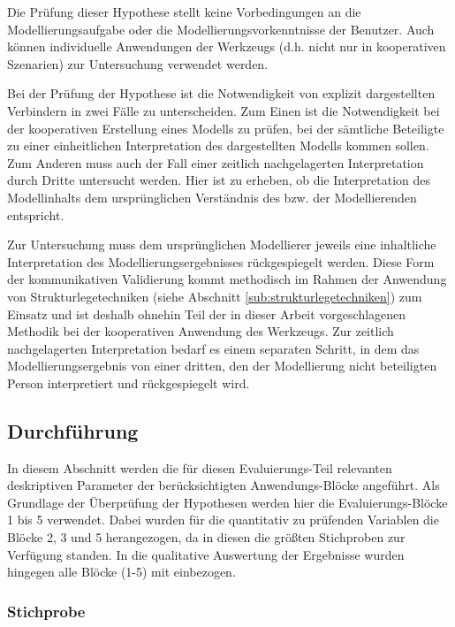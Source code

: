 Die Prüfung dieser Hypothese stellt keine Vorbedingungen an die Modellierungsaufgabe oder die Modellierungsvorkenntnisse der Benutzer. Auch können individuelle Anwendungen der Werkzeugs (d.h. nicht nur in kooperativen Szenarien) zur Untersuchung verwendet werden. 

Bei der Prüfung der Hypothese ist die Notwendigkeit von explizit dargestellten Verbindern in zwei Fälle zu unterscheiden. Zum Einen ist die Notwendigkeit bei der kooperativen Erstellung eines Modells zu prüfen, bei der sämtliche Beteiligte zu einer einheitlichen Interpretation des dargestellten Modells kommen sollen. Zum Anderen muss auch der Fall einer zeitlich nachgelagerten Interpretation durch Dritte untersucht werden. Hier ist zu erheben, ob die Interpretation des Modellinhalts dem ursprünglichen Verständnis des bzw. der Modellierenden entspricht.

Zur Untersuchung muss dem ursprünglichen Modellierer jeweils eine inhaltliche Interpretation des Modellierungsergebnisses rückgespiegelt werden. Diese Form der kommunikativen Validierung kommt methodisch im Rahmen der Anwendung von Strukturlegetechniken (siehe Abschnitt \ref{sub:strukturlegetechniken}) zum Einsatz und ist deshalb ohnehin Teil der in dieser Arbeit vorgeschlagenen Methodik bei der kooperativen Anwendung des Werkzeugs. Zur zeitlich nachgelagerten Interpretation bedarf es einem separaten Schritt, in dem das Modellierungsergebnis von einer dritten, den der Modellierung nicht beteiligten Person interpretiert und rückgespiegelt wird. 


\subsection{Durchführung} %
\label{sub:m_durchführung}

In diesem Abschnitt werden die für diesen Evaluierungs-Teil relevanten deskriptiven Parameter der berücksichtigten Anwendungs-Blöcke angeführt.
Als Grundlage der Überprüfung der Hypothesen werden hier die Evaluierungs-Blöcke 1 bis 5 verwendet. Dabei wurden für die quantitativ zu prüfenden Variablen die Blöcke 2, 3 und 5 herangezogen, da in diesen die größten Stichproben zur Verfügung standen. In die qualitative Auswertung der Ergebnisse wurden hingegen alle Blöcke (1-5) mit einbezogen.

\subsubsection{Stichprobe} %
\label{ssub:stichprobe}

